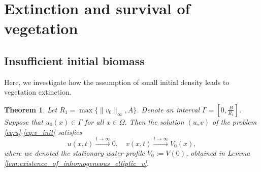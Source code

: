 \documentclass[12pt, a4paper]{article}
\theoremstyle{break}
\newtheorem{thm}{Theorem}[section]
\theoremstyle{break}
\theoremstyle{break}
\theoremstyle{break}
\theoremstyle{break}
\theoremstyle{break}
\theoremstyle{break}
\begin{document}
\section{Extinction and survival of vegetation}

\subsection{Insufficient initial biomass} Here, we investigate how the assumption of small initial density leads to vegetation extinction.

\begin{thm}
    \label{thm:Exinction-Of-Vegetation}
    Let $R_1 = \max\{\|v_0\|_\infty, A\}$. Denote an interval $\Gamma  = \left[0, \frac{B}{R_1}\right]$. Suppose that $u_0(x) \in \Gamma$ for all $x \in \Omega$. Then the solution $(u, v)$ of the problem \eqref{eq:u}-\eqref{eq:v_init} satisfies
    \begin{equation}
        u(x,t) \xrightarrow{t \rightarrow \infty} 0, \quad v(x,t) \xrightarrow{t \rightarrow \infty} V_0(x),
    \end{equation}
    where we denoted the stationary water profile $V_0 := V(0)$, obtained in Lemma \ref{lem:existence_of_inhomogeneous_elliptic_v}.
\end{thm}
\end{document}
